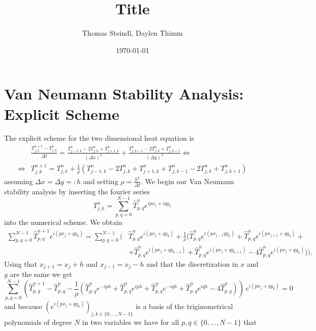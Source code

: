 \documentclass[a4aper,pagesize]{scrartcl}
\title{Title}
\date{\today}
\author{Thomas Steindl, Daylen Thimm}
\theoremstyle{definition}
\theoremstyle{plain}
\theoremstyle{remark}
\renewcommand{\hat}{\widehat}
\begin{document}
\maketitle

\section{Van Neumann Stability Analysis: Explicit Scheme}
The explicit scheme for the two dimensional heat equation is
\begin{align}
	&\frac{T_{j,k}^{n+1} - T_{j,k}^{n}}{\Delta t} = \frac{T_{j-1,k}^{n} - 2 T_{j,k}^{n} + T_{j+1,k}^{n}}{(\Delta x)^2} + \frac{T_{j,k-1}^{n} - 2 T_{j,k}^{n} + T_{j,k+1}^{n}}{(\Delta y)^2} \Leftrightarrow\\
	\Leftrightarrow & T_{j,k}^{n+1} =  T_{j,k}^{n} + \frac{1}{\rho} \left( T_{j-1,k}^{n} - 2 T_{j,k}^{n} + T_{j+1,k}^{n} + T_{j,k-1}^{n} - 2 T_{j,k}^{n} + T_{j,k+1}^{n}\right)
\end{align}
assuming $\Delta x = \Delta y =: h$ and setting $\rho = \frac{h^2}{\Delta t}$. We begin our Van Neumann stability analysis by inserting the fourier series
\begin{equation}
	T_{j,k}^n = \sum_{p,q = 0}^{N-1} \hat{T}^n_{p,q} e^{ipx_j + iqy_k}
\end{equation}
into the numerical scheme. We obtain
\begin{equation}
	\begin{split}
		\sum_{p,q = 0}^{N-1} \hat{T}^{n+1}_{p,q} e^{i(px_{j} + qy_{k})} =
		\sum_{p,q = 0}^{N-1} (
			&\hat{T}^{n}_{p,q} e^{i(px_{j} + qy_{k})} +
			\frac{1}{\rho} (
			  	  \hat{T}^{n}_{p,q} e^{i(px_{j-1} qy_{k})}
				+ \hat{T}^{n}_{p,q} e^{i(px_{j+1} + qy_{k})} + \\
			   &+ \hat{T}^{n}_{p,q} e^{i(px_{j} + qy_{k-1})}
				+ \hat{T}^{n}_{p,q} e^{i(px_{j} + qy_{k+1})}
				-  4 \hat{T}^{n}_{p,q} e^{i(px_{j} + qy_{k})}
			)
		).
	\end{split}
\end{equation}
Using that $x_{j+1} = {x_j} + h$ and $x_{j-1} = {x_j} - h$ and that the discretization in $x$ and $y$ are the same we get
\begin{equation}
	\sum_{p,q = 0}^{N-1}(
		  \hat{T}^{n+1}_{p,q}
		- \hat{T}^{n}_{p,q}
		-\frac{1}{\rho} (
			  \hat{T}^{n}_{p,q} e^{-iph}
			+ \hat{T}^{n}_{p,q} e^{iph}
		    + \hat{T}^{n}_{p,q} e^{-iqh}
			+ \hat{T}^{n}_{p,q} e^{iqh}
			-  4 \hat{T}^{n}_{p,q}
		)
	)\, e^{i(px_{j} + qy_{k})} = 0
\end{equation}
and because $(e^{i(px_{j} + qy_{k})})_{j,k \in \{0, ..., N-1\}}$ is a basis of the triginometrical polynomials of degree $N$ in two variables we have for all $p,q \in \{0, \dots, N-1\}$ that
\end{document}
